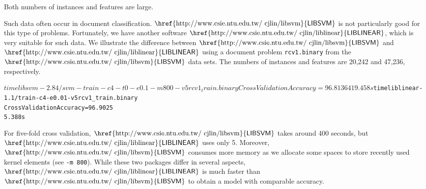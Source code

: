 \documentclass[12pt]{article}
\newcommand{\libsvm}{$\mbox{\href{http://www.csie.ntu.edu.tw/~cjlin/libsvm}{\sf LIBSVM}}$\xspace}
\newcommand{\liblinear}{$\mbox{\href{http://www.csie.ntu.edu.tw/~cjlin/liblinear}{\sf LIBLINEAR}}$\xspace}
\begin{document}
\medskip

 Both numbers of instances and features are
  large.

  Such data often occur in document classification. \libsvm is not
particularly good for this type of problems. Fortunately, we have another
  software \liblinear \cite{CJL07a}, which is very suitable for such data. We
  illustrate the difference between \libsvm and \liblinear using a
  document problem
{\tt rcv1.binary} from the \libsvm data sets.
The numbers of instances and features are
20,242 and 47,236, respectively.
\begin{alltt}$ time libsvm-2.84/svm-train -c 4 -t 0 -e 0.1 -m 800 -v 5 rcv1_train.binary
Cross Validation Accuracy = 96.8136%
419.458s
$ time liblinear-1.1/train -c 4 -e 0.01 -v 5 rcv1_train.binary
Cross Validation Accuracy = 96.9025%
5.388s
\end{alltt}
For five-fold cross validation,
\libsvm takes around 400 seconds, but
\liblinear uses only 5. Moreover,
\libsvm consumes more memory as we
allocate some spaces to store
recently used kernel elements
(see {\tt -m 800}).
While these two packages differ
in several aspects,
\liblinear is much faster
than \libsvm to obtain a model with
comparable accuracy.



\end{document}

